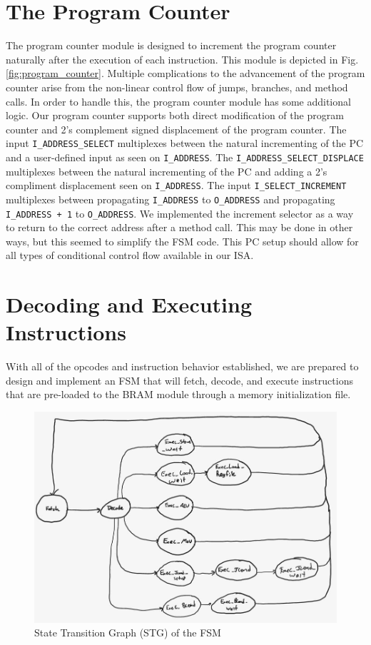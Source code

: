 \documentclass[conference]{IEEEtran}
\begin{document}
\section{The Program Counter}
The program counter module is designed to increment the program counter naturally after the execution of each instruction. This module is depicted in Fig. \ref{fig:program_counter}. Multiple complications to the advancement of the program counter arise from the non-linear control flow of jumps, branches, and method calls. In order to handle this, the program counter module has some additional logic. Our program counter supports both direct modification of the program counter and 2's complement signed displacement of the program counter. The input \verb|I_ADDRESS_SELECT| multiplexes between the natural incrementing of the PC and a user-defined input as seen on \verb|I_ADDRESS|. The \verb|I_ADDRESS_SELECT_DISPLACE| multiplexes between the natural incrementing of the PC and adding a 2's compliment displacement seen on \verb|I_ADDRESS|. The input \verb|I_SELECT_INCREMENT| multiplexes between propagating \verb|I_ADDRESS| to \verb|O_ADDRESS| and propagating \verb|I_ADDRESS + 1| to \verb|O_ADDRESS|. We implemented the increment selector as a way to return to the correct address after a method call. This may be done in other ways, but this seemed to simplify the FSM code. This PC setup should allow for all types of conditional control flow available in our ISA.

\section{Decoding and Executing Instructions}
With all of the opcodes and instruction behavior established, we are prepared to design and implement an FSM that will fetch, decode, and execute instructions that are pre-loaded to the BRAM module through a memory initialization file.

\begin{figure}[ht]
    \centering
    \includegraphics[scale=0.45]{resources/figures/fsm_stg.jpg}
    \caption{State Transition Graph (STG) of the FSM}
    \label{fig:fsm_stg}
\end{figure}
\end{document}
